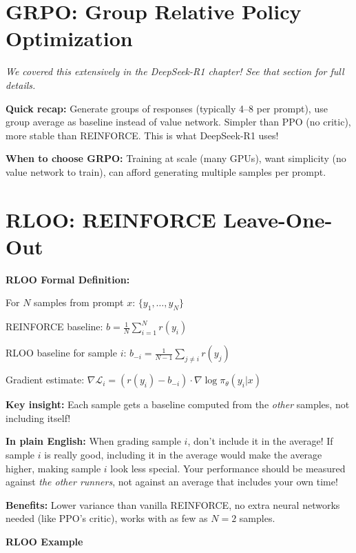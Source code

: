 \begin{chapterenv}
\section{GRPO: Group Relative Policy Optimization}

\textit{We covered this extensively in the DeepSeek-R1 chapter! See that section for full details.}

\begin{infobox}
\textbf{Quick recap:} Generate groups of responses (typically 4--8 per prompt), use group average as baseline instead of value network. Simpler than PPO (no critic), more stable than REINFORCE. This is what DeepSeek-R1 uses!

\textbf{When to choose GRPO:} Training at scale (many GPUs), want simplicity (no value network to train), can afford generating multiple samples per prompt.
\end{infobox}

\section{RLOO: REINFORCE Leave-One-Out}

\begin{infobox}
\textbf{RLOO Formal Definition:}

For $N$ samples from prompt $x$: $\{y_1, \ldots, y_N\}$

REINFORCE baseline: $b = \frac{1}{N}\sum_{i=1}^N r(y_i)$

RLOO baseline for sample $i$: $b_{-i} = \frac{1}{N-1}\sum_{j \neq i} r(y_j)$

Gradient estimate: $\nabla \mathcal{L}_i = (r(y_i) - b_{-i}) \cdot \nabla \log \pi_\theta(y_i | x)$

\textbf{Key insight:} Each sample gets a baseline computed from the \textit{other} samples, not including itself!

\textbf{In plain English:} When grading sample $i$, don't include it in the average! If sample $i$ is really good, including it in the average would make the average higher, making sample $i$ look less special. Your performance should be measured against \textit{the other runners}, not against an average that includes your own time!

\textbf{Benefits:} Lower variance than vanilla REINFORCE, no extra neural networks needed (like PPO's critic), works with as few as $N=2$ samples.
\end{infobox}

\textbf{RLOO Example}


\end{chapterenv}
